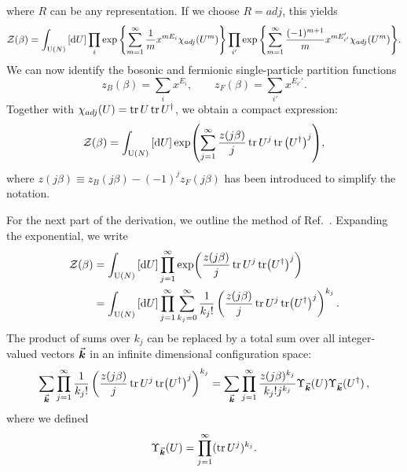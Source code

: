 \documentclass[a4paper,11pt]{article}
\begin{document}
where $R$ can be any representation. 
%
If we choose $R=adj$, this yields 
%
\begin{equation} \label{eq:derivation_step4}
	\mathcal{Z}(\beta) = \int_{\text{U}(N)}\left[ \dd U\right]  \prod_{i}\exp \qty{ \sum_{m=1}^\infty \frac{1}{m} x^{mE_i} \chi_{adj}(U^m) }   \prod_{i'}\exp \qty{ \sum_{m=1}^\infty \frac{(-1)^{m+1}}{m} x^{mE_{i'}'} \chi_{adj}(U^m) }  .
\end{equation}
%
We can now identify the bosonic and fermionic single-particle partition functions
%
\begin{equation}
	z_B(\beta) = \sum_i x^{E_i}, \qquad z_F(\beta) = \sum_{i'} x^{E_{i'}'}  .
\end{equation}
%
Together with $\chi_{adj}(U) = \tr U \tr U^\dag$, we obtain a compact expression:
%
\begin{equation}
	\mathcal{Z}(\beta) = \int_{\text{U}(N)}\left[ \dd U\right] \exp(\sum_{j=1}^{\infty} \frac{z(j\beta)}{j}\tr U^j \tr\qty(U^\dag)^j)  ,
\end{equation}
%
where $z(j\beta) \equiv z_B(j\beta) - (-1)^j z_F(j\beta)$ has been introduced to simplify the notation.

For the next part of the derivation, we outline the method of Ref.\ \cite{Dutta:2007ws}. Expanding the exponential, we write
%
\begin{equation}
\begin{split}
	\mathcal{Z}(\beta) &= \int_{\text{U}(N)}\left[ \dd U\right] \prod_{j=1}^\infty \exp(\frac{z(j\beta)}{j}\tr U^j \tr(U^\dag)^j) \\
	&= \int_{\text{U}(N)}\left[ \dd U\right] \prod_{j=1}^\infty \sum_{k_j=0}^\infty \frac{1}{k_j!}\left( \frac{z(j\beta)}{j}\tr U^j \tr(U^\dag)^j \right)^{k_j}  .
\end{split}
\end{equation}
%
The product of sums over $k_j$ can be replaced by a total sum over all integer-valued vectors $\va*{k}$ in an infinite dimensional configuration space:
%
\begin{equation}
	\sum_{\va*{k}} \prod_{j=1}^\infty \frac{1}{k_j!}\left( \frac{z(j\beta)}{j}\tr U^j \tr(U^\dag)^j \right)^{k_j}
	= \sum_{\va*{k}} \prod_{j=1}^\infty \frac{z(j\beta)^{k_j}}{k_j! j^{k_j}} \Upsilon_{\va*{k}}(U) \Upsilon_{\va*{k}}(U^\dag) \,,
\end{equation}
%
where we defined
%
\begin{equation}
	\Upsilon_{\va*{k}}(U) = \prod_{j=1}^\infty ( \tr U^j )^{k_j} .
\end{equation}
%
\end{document}
